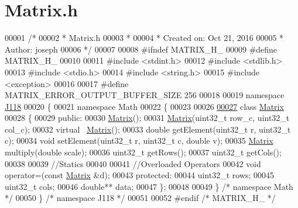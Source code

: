 \hypertarget{_matrix_8h_source}{}\section{Matrix.\+h}
\label{_matrix_8h_source}

\begin{DoxyCode}
00001 \textcolor{comment}{/*}
00002 \textcolor{comment}{ * Matrix.h}
00003 \textcolor{comment}{ *}
00004 \textcolor{comment}{ *  Created on: Oct 21, 2016}
00005 \textcolor{comment}{ *      Author: joseph}
00006 \textcolor{comment}{ */}
00007 
00008 \textcolor{preprocessor}{#ifndef MATRIX\_H\_}
00009 \textcolor{preprocessor}{#define MATRIX\_H\_}
00010 
00011 \textcolor{preprocessor}{#include <stdint.h>}
00012 \textcolor{preprocessor}{#include <stdlib.h>}
00013 \textcolor{preprocessor}{#include <stdio.h>}
00014 \textcolor{preprocessor}{#include <string.h>}
00015 \textcolor{preprocessor}{#include <exception>}
00016 
00017 \textcolor{preprocessor}{#define MATRIX\_ERROR\_OUTPUT\_BUFFER\_SIZE 256}
00018 
00019 \textcolor{keyword}{namespace }\hyperlink{namespace_j118}{J118}
00020 \{
00021 \textcolor{keyword}{namespace }Math
00022 \{
00023 
00026 
\hypertarget{_matrix_8h_source_l00027}{}\hyperlink{class_j118_1_1_math_1_1_matrix}{00027} \textcolor{keyword}{class }\hyperlink{class_j118_1_1_math_1_1_matrix}{Matrix}
00028 \{
00029 \textcolor{keyword}{public}:
00030     \hyperlink{class_j118_1_1_math_1_1_matrix}{Matrix}();
00031     \hyperlink{class_j118_1_1_math_1_1_matrix}{Matrix}(uint32\_t row\_c, uint32\_t col\_c);
00032     \textcolor{keyword}{virtual} ~\hyperlink{class_j118_1_1_math_1_1_matrix}{Matrix}();
00033     \textcolor{keywordtype}{double} getElement(uint32\_t r, uint32\_t c);
00034     \textcolor{keywordtype}{void} setElement(uint32\_t r, uint32\_t c, \textcolor{keywordtype}{double} v);
00035     \hyperlink{class_j118_1_1_math_1_1_matrix}{Matrix} multiply(\textcolor{keywordtype}{double} scale);
00036     uint32\_t getRows();
00037     uint32\_t getCols();
00038 
00039     \textcolor{comment}{//Statics}
00040 
00041     \textcolor{comment}{//Overloaded Operators}
00042     \textcolor{keywordtype}{void} operator=(\textcolor{keyword}{const} \hyperlink{class_j118_1_1_math_1_1_matrix}{Matrix} &d);
00043 \textcolor{keyword}{protected}:
00044     uint32\_t rows;
00045     uint32\_t cols;
00046     \textcolor{keywordtype}{double}** data;
00047 \};
00048 
00049 \} \textcolor{comment}{/* namespace Math */}
00050 \} \textcolor{comment}{/* namespace J118 */}
00051 
00052 \textcolor{preprocessor}{#endif }\textcolor{comment}{/* MATRIX\_H\_ */}\textcolor{preprocessor}{}
\end{DoxyCode}
